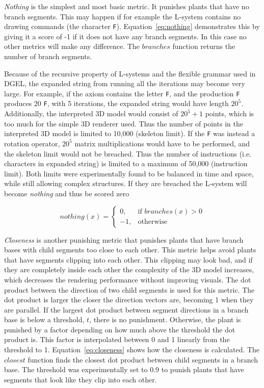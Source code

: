 \textit{Nothing} is the simplest and most basic metric.
It punishes plants that have no branch segments.
This may happen if for example the \gls{L-system} contains no drawing commands (the character \texttt{F}).
Equation~\ref{eq:nothing} demonstrates this by giving it a score of -1 if it does not have any branch segments.
In this case no other metrics will make any difference.
The $branches$ function returns the number of branch segments.

Because of the recursive property of \glspl{L-system} and the flexible grammar used in \gls{DGEL}, the expanded string from running all the iterations may become very large.
For example, if the axiom contains the letter \texttt{F}, and the production \texttt{F} produces 20 \texttt{F}, with 5 iterations, the expanded string would have length $20^5$.
Additionally, the interpreted 3D model would consist of $20^5 + 1$ points, which is too much for the simple 3D renderer used.
Thus the number of points in the interpreted 3D model is limited to 10,000 (skeleton limit).
If the \texttt{F} was instead a rotation operator, $20^5$ matrix multiplications would have to be performed, and the skeleton limit would not be breached.
Thus the number of instructions (i.e. characters in expanded string) is limited to a maximum of 50,000 (instruction limit).
Both limits were experimentally found to be balanced in time and space, while still allowing complex structures.
If they are breached the \gls{L-system} will become \textit{nothing} and thus be scored zero

\begin{equation}
\label{eq:nothing}
    nothing(x) =
    \begin{cases}
        0,& \text{if } branches(x) > 0  \\
        -1,& \text{otherwise}
    \end{cases}
\end{equation}

\textit{Closeness} is another punishing metric that punishes plants that have branch bases with child segments too close to each other.
This metric helps avoid plants that have segments clipping into each other.
This clipping may look bad, and if they are completely inside each other the complexity of the 3D model increases, which decreases the rendering performance without improving visuals.
The dot product between the direction of two child segments is used for this metric.
The dot product is larger the closer the direction vectors are, becoming 1 when they are parallel.
If the largest dot product between segment directions in a branch base is below a threshold, $t$, there is no punishment.
Otherwise, the plant is punished by a factor depending on how much above the threshold the dot product is.
This factor is interpolated between 0 and 1 linearly from the threshold to 1.
Equation~\ref{eq:closeness} shows how the closeness is calculated.
The $closest$ function finds the closest dot product between child segments in a branch base.
The threshold was experimentally set to 0.9 to punish plants that have segments that look like they clip into each other.

